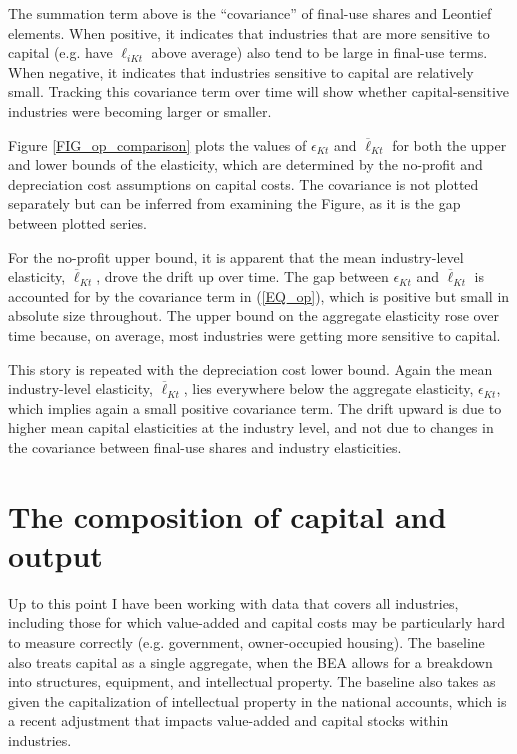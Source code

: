 \documentclass[11pt]{article}
\begin{document}
The summation term above is the ``covariance'' of final-use shares and Leontief elements. When positive, it indicates that industries that are more sensitive to capital (e.g. have $\ell_{iKt}$ above average) also tend to be large in final-use terms. When negative, it indicates that industries sensitive to capital are relatively small. Tracking this covariance term over time will show whether capital-sensitive industries were becoming larger or smaller.

Figure \ref{FIG_op_comparison} plots the values of $\epsilon_{Kt}$ and $\overline{\ell}_{Kt}$ for both the upper and lower bounds of the elasticity, which are determined by the no-profit and depreciation cost assumptions on capital costs. The covariance is not plotted separately but can be inferred from examining the Figure, as it is the gap between plotted series. 

For the no-profit upper bound, it is apparent that the mean industry-level elasticity, $\overline{\ell}_{Kt}$, drove the drift up over time. The gap between $\epsilon_{Kt}$ and $\overline{\ell}_{Kt}$ is accounted for by the covariance term in (\ref{EQ_op}), which is positive but small in absolute size throughout. The upper bound on the aggregate elasticity rose over time because, on average, most industries were getting more sensitive to capital. 

This story is repeated with the depreciation cost lower bound. Again the mean industry-level elasticity, $\overline{\ell}_{Kt}$, lies everywhere below the aggregate elasticity, $\epsilon_{Kt}$, which implies again a small positive covariance term. The drift upward is due to higher mean capital elasticities at the industry level, and not due to changes in the covariance between final-use shares and industry elasticities. 

\section{The composition of capital and output}
Up to this point I have been working with data that covers all industries, including those for which value-added and capital costs may be particularly hard to measure correctly (e.g. government, owner-occupied housing). The baseline also treats capital as a single aggregate, when the BEA allows for a breakdown into structures, equipment, and intellectual property. The baseline also takes as given the capitalization of intellectual property in the national accounts, which is a recent adjustment that impacts value-added and capital stocks within industries.
\end{document}
